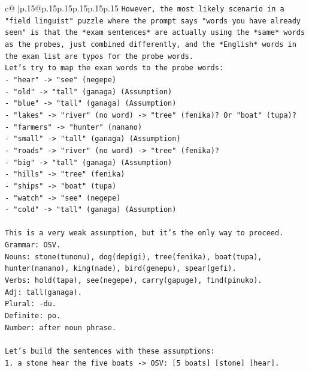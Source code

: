 \documentclass{article}
\begin{document}
{\begin{supertabular}{c@{$\;$}|p{.15\linewidth}@{}p{.15\linewidth}p{.15\linewidth}p{.15\linewidth}p{.15\linewidth}p{.15\linewidth}}
{{{\texttt{However, the most likely scenario in a "field linguist" puzzle where the prompt says "words you have already seen" is that the *exam sentences* are actually using the *same* words as the probes, just combined differently, and the *English* words in the exam list are typos for the probe words.} \\
\texttt{Let's try to map the exam words to the probe words:} \\
\texttt{{-} "hear" {-}> "see" (negepe)} \\
\texttt{{-} "old" {-}> "tall" (ganaga) (Assumption)} \\
\texttt{{-} "blue" {-}> "tall" (ganaga) (Assumption)} \\
\texttt{{-} "lakes" {-}> "river" (no word) {-}> "tree" (fenika)? Or "boat" (tupa)?} \\
\texttt{{-} "farmers" {-}> "hunter" (nanano)} \\
\texttt{{-} "small" {-}> "tall" (ganaga) (Assumption)} \\
\texttt{{-} "roads" {-}> "river" (no word) {-}> "tree" (fenika)?} \\
\texttt{{-} "big" {-}> "tall" (ganaga) (Assumption)} \\
\texttt{{-} "hills" {-}> "tree" (fenika)} \\
\texttt{{-} "ships" {-}> "boat" (tupa)} \\
\texttt{{-} "watch" {-}> "see" (negepe)} \\
\texttt{{-} "cold" {-}> "tall" (ganaga) (Assumption)} \\
\\ 
\texttt{This is a very weak assumption, but it's the only way to proceed.} \\
\texttt{Grammar: OSV.} \\
\texttt{Nouns: stone(tunonu), dog(depigi), tree(fenika), boat(tupa), hunter(nanano), king(nade), bird(genepu), spear(gefi).} \\
\texttt{Verbs: hold(tapa), see(negepe), carry(gapuge), find(pinuko).} \\
\texttt{Adj: tall(ganaga).} \\
\texttt{Plural: {-}du.} \\
\texttt{Definite: po.} \\
\texttt{Number: after noun phrase.} \\
\\ 
\texttt{Let's build the sentences with these assumptions:} \\
\texttt{1. a stone hear the five boats {-}> OSV: {[}5 boats{]} {[}stone{]} {[}hear{]}.} \\
}}}
\end{supertabular}}
\end{document}
